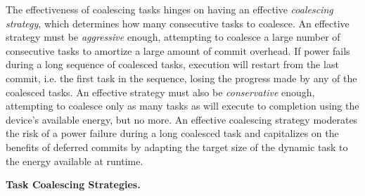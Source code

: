 The effectiveness of coalescing tasks hinges on having an effective {\em
coalescing strategy}, which determines how many consecutive tasks to coalesce.
An effective strategy must be {\em aggressive} enough, attempting to coalesce a
large number of consecutive tasks to amortize a large amount of commit overhead.   
%
If power fails during a long sequence of coalesced tasks, execution will
restart from the last commit, i.e. the first task in the sequence, losing the
progress made by any of the coalesced tasks.
%
An effective strategy must also be {\em
conservative} enough, attempting to coalesce only as many tasks as will execute
to completion using the device's available energy, but no more.
%
An effective coalescing strategy moderates the risk of a power failure during a
long coalesced task and capitalizes on the benefits of deferred commits by
adapting the target size of the dynamic task to the energy available at
runtime. 


%

\noindent \textbf{Task Coalescing Strategies.} 

